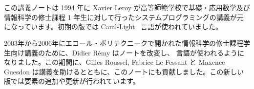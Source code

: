 %
%

\chapter*{\label{sec/intro}}
\enlargethispage{2\baselineskip} %

この講義ノートは 1994 年に Xavier Leroy が高等師範学校で基礎・応用数学及び情報科学の修士課程 1 年生に対して行ったシステムプログラミングの講義が元になっています。初期の版では Caml-Light~\cite{Caml-Light} 言語が使われていました。

%
2003年から2006年にエコール・ポリテクニークで開かれた情報科学の修士課程学生向け講義のために、Didier R\'emy はノートを改変し、 \ocaml \cite{OCaml} 言語が使われるようになりました。この期間に、Gilles Roussel, Fabrice Le Fessant と Maxence Guesdon は講義を助けるとともに、このノートにも貢献しました。この新しい版では要素の追加や更新が行われています。

